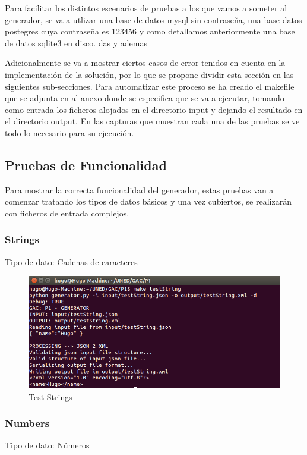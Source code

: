 \documentclass[a4paper,11pt]{book}
\begin{document}
Para facilitar los distintos escenarios de pruebas a los que vamos a someter al generador, se va a utlizar una base de datos mysql sin contraseña, una base datos postegres cuya contraseña es 123456 y como detallamos anteriormente una base de datos sqlite3 en disco. das y ademas 


 Adicionalmente se va a mostrar ciertos casos de error tenidos en cuenta en la implementación de la solución, por lo que se propone dividir esta sección en las siguientes sub-secciones. Para automatizar este proceso se ha creado el makefile que se adjunta en al anexo donde se especifica que se va a ejecutar, tomando como entrada los ficheros alojados en el directorio input y dejando el resultado en el directorio output. En las capturas que muestran cada una de las pruebas se ve todo lo necesario para su ejecución.  

\subsection{Pruebas de Funcionalidad}
Para mostrar la correcta funcionalidad del generador, estas pruebas van a comenzar tratando los tipos de datos básicos y una vez cubiertos, se realizarán con ficheros de entrada complejos. 

\subsubsection{Strings}
Tipo de dato: Cadenas de caracteres

\begin{figure}[H]  
\centering 
\includegraphics[scale=0.35]{imagenes/testString.png}
\caption{ Test Strings  }  
\end{figure} 

\subsubsection{Numbers}
Tipo de dato: Números
\end{document}
